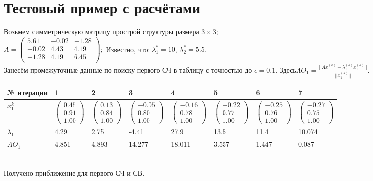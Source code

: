 \documentclass[12pt]{article}
\begin{document}
\section{Тестовый пример с расчётами}
Возьмем симметрическую матрицу прострой структуры размера $3\times3$;\\
$A = \begin{pmatrix}
5.61& -0.02& -1.28 \\
-0.02& 4.43& 4.19\\
-1.28& 4.19& 6.45\\
\end{pmatrix};$ Известно, что: $\lambda_1^* = 10$, $\lambda_2^* = 5.5$.\\
Занесём промежуточные данные по поиску первого СЧ в таблицу с точностью до $\epsilon = 0.1$. Здесь$\displaystyle AO_1 =  \frac{||Ax_1^{(k)}-\lambda_1^{(k)}x_1^{(k)}||}{||x_1^{(k)}||} $.\\
\begin{tabular}{|p{2cm}|p{1.5cm}|p{1.5cm}|p{1.5cm}|p{1.5cm}|p{1.5cm}|p{1.5cm}|p{1.5cm}|}
\hline
   № итерации & 1 & 2 & 3 & 4 & 5 & 6 & 7\\ \hline
   $x_1^{k}$ &$\begin{pmatrix} 0.45\\ 0.91\\ 1.00 \end{pmatrix}$ &$\begin{pmatrix} 0.13\\ 0.84\\ 1.00 \end{pmatrix}$  &$\begin{pmatrix} -0.05\\ 0.80\\ 1.00 \end{pmatrix}$  &$\begin{pmatrix} -0.16\\ 0.78\\ 1.00 \end{pmatrix}$ &$\begin{pmatrix} -0.22\\ 0.77\\ 1.00 \end{pmatrix}$ &$\begin{pmatrix} -0.25\\ 0.76\\ 1.00 \end{pmatrix}$  & $\begin{pmatrix} -0.27\\ 0.75\\ 1.00 \end{pmatrix}$ \\ \hline
   $\lambda_1$ & 4.29 &2.75 &-4.41 &27.9 &13.5 &11.4 &10.074 \\\hline
   $AO_1$ & 4.851 &4.893 &14.277 &18.011 &3.557 &1.447&0.087 \\ \hline
\end{tabular}\\Получено приближение для первого СЧ и СВ.
\end{document}
